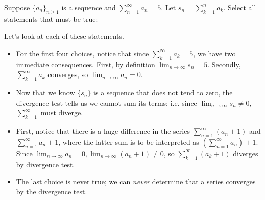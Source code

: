 \documentclass{ximera}
\begin{document}
\begin{question}
  Suppose $\{a_n\}_{n \geq 1}$ is a sequence and $\sum^{\infty}_{n= 1}
  a_n=5$.  Let $s_n = \sum^n_{k=1} a_k$. Select all
  statements that must be true:
  \begin{selectAll}
  \end{selectAll}
  
\begin{feedback}
Let's look at each of these statements.
\begin{itemize}
\item For the first four choices, notice that since $\sum_{k=1}^{\infty} a_k =5$, we have two immediate consequences.  First, by definition $\lim_{n \to \infty} s_n = 5$.  Secondly, $\sum_{k=1}^{\infty} a_k$ converges, so $\lim_{n \to \infty} a_n = 0$.
\item Now that we know $\{s_n\}$ is a sequence that does not tend to zero, the divergence test tells us we cannot sum its terms; i.e. since $\lim_{n \to \infty} s_n \neq 0$, $\sum_{k=1}^{\infty}$ must diverge.
\item First, notice that there is a huge difference in the series $\sum^{\infty}_{n=1} (a_n+1)$ and $\sum^{\infty}_{n=1} a_n+1$, where the latter sum is to be interpreted as $\left(\sum^{\infty}_{n=1} a_n\right)+1$.  Since $\lim_{n \to \infty} a_n =0, \lim_{n \to \infty} (a_n+1) \neq 0$, so $\sum^{\infty}_{k=1} (a_k+1)$ diverges by divergence test.
\item The last choice is never true; we can \emph{never} determine that a series converges by the divergence test.
 \end{itemize}
\end{feedback}
  
\end{question}
\end{document}
